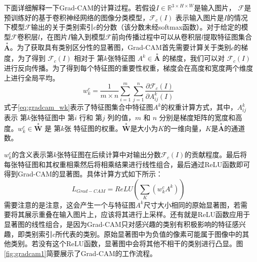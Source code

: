 下面详细解释一下Grad-CAM的计算过程。若假设$I \in \mathbb{R}^{3\times H \times W}$是输入图片， $\mathcal{F}$是预训练好的基于卷积神经网络的图像分类模型，$\mathcal{F}_c(I)$ 表示输入图片是$I$的情况下模型$\mathcal{F}$输出的关于类别索引$c$的分数（该分数未经softmax函数）。对于给定的模型$\mathcal{F}$卷积层$l$，在图片$I$输入到模型$\mathcal{F}$前向传播过程中可以从卷积层$l$提取特征图集合$\overset{*}{\bm{A}}$。为了获取具有类别区分性的显著图，Grad-CAM首先需要计算关于类别$c$的梯度，为了得到 $\mathcal{F}_c(I)$ 相对于 第$k$张特征图 $A^k \in \overset{*}{\bm{A}}$ 的梯度，我们可以对 $\mathcal{F}_c(I)$ 进行反向传播。为了得到每个特征图的重要性权重，梯度会在高度和宽度两个维度上进行全局平均。
\begin{equation}
	w^c_k=\frac{1}{m\times n}\sum_{i=1}^{m}\sum_{j=1}^{n}\frac{\partial \mathcal{F}_c(I)}{\partial A_{ij}^k(I)}
	\label{eq:gradcam_wk}
\end{equation}
式子\ref{eq:gradcam_wk}表示了特征图集合中特征图$A^k$的权重计算方式，其中，$A_{ij}^k$ 表示 第$k$张特征图中 第$i$ 行和 第$j$ 列的值，$m$ 和 $n$ 分别是梯度矩阵的宽度和高度。$w^c_k \in \overset{*}{\bm{W}}$ 是 第$k$张 特征图的权重。$\overset{*}{\bm{W}}$是大小为$K$的一维向量，$K$是$\overset{*}{\bm{A}}$的通道数。


$w^c_k $的含义表示第$k$张特征图在后续计算中对输出分数$\mathcal{F}_c(I)$的贡献程度。最后将每张特征图和其权重相乘然后将相乘结果进行线性组合，最后通过ReLU函数即可得到Grad-CAM的显著图。具体计算方式如下所示：
\begin{equation}
	L_{Grad-CAM}=ReLU(\sum_K(w^c_k A^k))
	\label{eq:gradcam}
\end{equation}
需要注意的是注意，这会产生一个与特征图$A^k$尺寸大小相同的原始显著图，若需要将其展示重叠在输入图片上，应该将其进行上采样。还有就是ReLU函数应用于显著图的线性组合，是因为Grad-CAM只对感兴趣的类别有积极影响的特征感兴趣，即类别索引$c$所代表的类别。原始显著图中为负值的像素可能属于图像中的其他类别。若没有这个ReLU函数，显著图中会将其他不相干的类别进行凸显。图\ref{fig:gradcam1}简要展示了Grad-CAM的工作流程。


